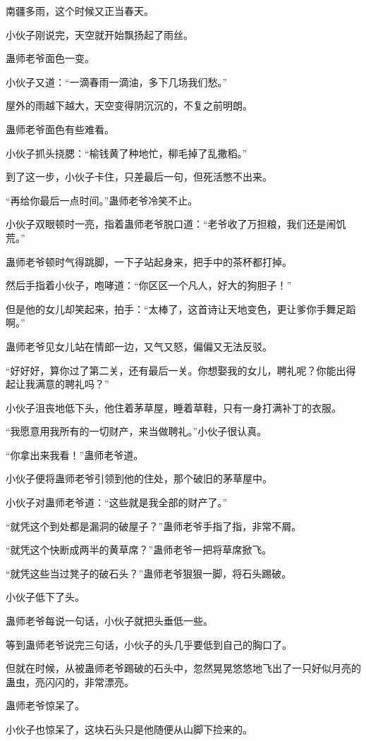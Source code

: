 \begin{this_body}
南疆多雨，这个时候又正当春天。

小伙子刚说完，天空就开始飘扬起了雨丝。

蛊师老爷面色一变。

小伙子又道：“一滴春雨一滴油，多下几场我们愁。”

屋外的雨越下越大，天空变得阴沉沉的，不复之前明朗。

蛊师老爷面色有些难看。

小伙子抓头挠腮：“榆钱黄了种地忙，柳毛掉了乱撒稻。”

到了这一步，小伙子卡住，只差最后一句，但死活憋不出来。

“再给你最后一点时间。”蛊师老爷冷笑不止。

小伙子双眼顿时一亮，指着蛊师老爷脱口道：“老爷收了万担粮，我们还是闹饥荒。”

蛊师老爷顿时气得跳脚，一下子站起身来，把手中的茶杯都打掉。

然后手指着小伙子，咆哮道：“你区区一个凡人，好大的狗胆子！”

但是他的女儿却笑起来，拍手：“太棒了，这首诗让天地变色，更让爹你手舞足蹈啊。”

蛊师老爷见女儿站在情郎一边，又气又怒，偏偏又无法反驳。

“好好好，算你过了第二关，还有最后一关。你想娶我的女儿，聘礼呢？你能出得起让我满意的聘礼吗？”

小伙子沮丧地低下头，他住着茅草屋，睡着草鞋，只有一身打满补丁的衣服。

“我愿意用我所有的一切财产，来当做聘礼。”小伙子很认真。

“你拿出来我看！”蛊师老爷道。

小伙子便将蛊师老爷引领到他的住处，那个破旧的茅草屋中。

小伙子对蛊师老爷道：“这些就是我全部的财产了。”

“就凭这个到处都是漏洞的破屋子？”蛊师老爷手指了指，非常不屑。

“就凭这个快断成两半的黄草席？”蛊师老爷一把将草席掀飞。

“就凭这些当过凳子的破石头？”蛊师老爷狠狠一脚，将石头踢破。

小伙子低下了头。

蛊师老爷每说一句话，小伙子就把头垂低一些。

等到蛊师老爷说完三句话，小伙子的头几乎要低到自己的胸口了。

但就在时候，从被蛊师老爷踢破的石头中，忽然晃晃悠悠地飞出了一只好似月亮的蛊虫，亮闪闪的，非常漂亮。

蛊师老爷惊呆了。

小伙子也惊呆了，这块石头只是他随便从山脚下捡来的。


\end{this_body}
